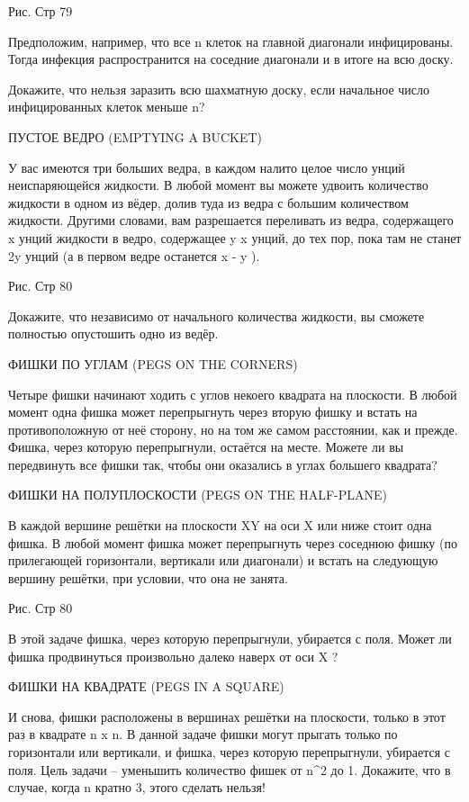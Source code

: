                                             Рис. Стр 79




  Предположим, например, что все n клеток на главной диагонали инфицированы. Тогда инфекция распространится на соседние диагонали и в итоге на всю доску.


  Докажите, что нельзя заразить всю шахматную доску, если начальное число инфицированных клеток меньше n?




ПУСТОЕ ВЕДРО (EMPTYING A BUCKET)


У вас имеются три больших ведра, в каждом налито целое число унций неиспаряющейся жидкости. В любой момент вы можете удвоить количество жидкости в одном из вёдер, долив туда из ведра с большим количеством жидкости. Другими словами, вам разрешается переливать из ведра, содержащего x унций жидкости в ведро, содержащее 
y  x унций, до тех пор, пока там не станет 2y унций (а в первом ведре останется x - y ).


                                 Рис. Стр 80


   Докажите, что независимо от начального количества жидкости, вы сможете полностью опустошить одно из ведёр.


ФИШКИ ПО УГЛАМ (PEGS ON THE CORNERS)


Четыре фишки начинают ходить с углов некоего квадрата на плоскости. В любой момент одна фишка может перепрыгнуть через вторую фишку и встать на противоположную от неё сторону, но на том же самом расстоянии, как и прежде. Фишка, через которую перепрыгнули, остаётся на месте. Можете ли вы передвинуть все фишки так, чтобы они оказались в углах большего квадрата?


ФИШКИ НА ПОЛУПЛОСКОСТИ (PEGS ON THE HALF-PLANE)


В каждой вершине решётки на плоскости XY на оси X или ниже стоит одна фишка. В любой момент фишка может перепрыгнуть через соседнюю фишку (по прилегающей горизонтали, вертикали или диагонали) и встать на следующую вершину решётки, при условии, что она не занята. 
                          
                                     Рис. Стр 80


В этой задаче фишка, через которую перепрыгнули, убирается с поля. 
  Может ли фишка продвинуться  произвольно далеко наверх от оси X ?




ФИШКИ НА КВАДРАТЕ (PEGS IN A SQUARE)


И снова, фишки расположены в вершинах решётки на плоскости, только в этот раз в квадрате n x n. В данной задаче фишки могут прыгать только по горизонтали или вертикали, и фишка, через которую перепрыгнули, убирается с поля. Цель задачи -- уменьшить количество фишек от n^2 до 1.
    Докажите, что в случае, когда n кратно 3, этого сделать нельзя!


